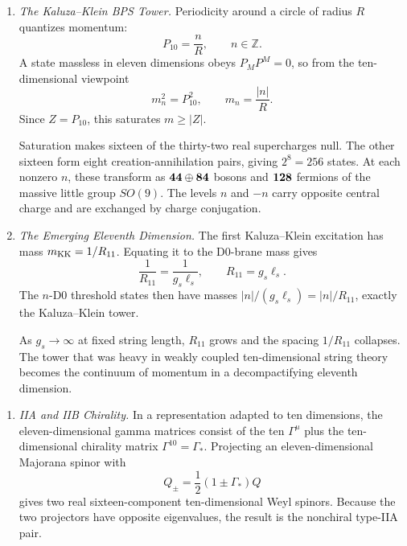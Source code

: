 \begin{enumerate}
\begin{enumerate}
      Under the decomposition into two ten-dimensional Majorana-Weyl
      supercharges of opposite chirality, \(\Gamma^{10}\) is the chirality
      operator.  The second term is consequently the scalar central-charge
      entry of the type-IIA algebra.  The geometric origin also shows why
      this central charge is conserved: it is ordinary momentum in the
      higher-dimensional theory.
    \item \emph{The Kaluza--Klein BPS Tower.}
    Periodicity around a circle of radius \(R\) quantizes momentum:
      \[
        P_{10}=\frac nR,\qquad n\in\mathbb Z.
      \]
      A state massless in eleven dimensions obeys
      \(P_M P^M=0\), so from the ten-dimensional viewpoint
      \[
        m_n^2=P_{10}^2,\qquad
        \boxed{m_n=\frac{|n|}{R}}.
      \]
      Since \(Z=P_{10}\), this saturates \(m\geq|Z|\).

      Saturation makes sixteen of the thirty-two real supercharges null.
      The other sixteen form eight creation-annihilation pairs, giving
      \(2^8=256\) states.  At each nonzero \(n\), these transform as
      \({\bf44}\oplus{\bf84}\) bosons and \({\bf128}\) fermions of the
      massive little group \(SO(9)\).  The levels \(n\) and \(-n\) carry
      opposite central charge and are exchanged by charge conjugation.
    \item \emph{The Emerging Eleventh Dimension.}
    The first Kaluza--Klein excitation has mass \(m_{\rm KK}=1/R_{11}\).
      Equating it to the D0-brane mass gives
      \[
        \frac1{R_{11}}=\frac1{g_s\ell_s},
        \qquad\boxed{R_{11}=g_s\ell_s}.
      \]
      The \(n\)-D0 threshold states then have masses
      \(|n|/(g_s\ell_s)=|n|/R_{11}\), exactly the Kaluza--Klein tower.

      As \(g_s\to\infty\) at fixed string length, \(R_{11}\) grows and the
      spacing \(1/R_{11}\) collapses.  The tower that was heavy in weakly
      coupled ten-dimensional string theory becomes the continuum of
      momentum in a decompactifying eleventh dimension.
  \end{enumerate}

  \begin{enumerate}
    \item \emph{IIA and IIB Chirality.}
    In a representation adapted to ten dimensions, the
      eleven-dimensional gamma matrices consist of the ten
      \(\Gamma^\mu\) plus the ten-dimensional chirality matrix
      \(\Gamma^{10}=\Gamma_*\).  Projecting an eleven-dimensional Majorana
      spinor with
      \[
        Q_\pm=\frac12(1\pm\Gamma_*)Q
      \]
      gives two real sixteen-component ten-dimensional Weyl spinors.
      Because the two projectors have opposite eigenvalues, the result is
      the nonchiral type-IIA pair.


\end{enumerate}
\end{enumerate}
